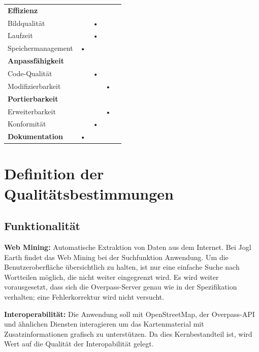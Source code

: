 \documentclass[10pt]{scrreprt}
\newenvironment{indents}{%
  \parskip6pt \parindent5mm \raggedright%
  \def\item{\hangindent=5mm \hangafter1}}{%
  \par\ignorespaces}
\begin{document}
\begin{center}
\begin{tabular}{lcccc}
\hline 
\rule[-1ex]{0pt}{4ex} \textbf{Effizienz} &  &  &  &  \\ 
\rule[-1ex]{0pt}{4ex} \hspace{10pt} Bildqualität & & • & & \\ 
\rule[-1ex]{0pt}{4ex} \hspace{10pt} Laufzeit & & • & & \\ 
\rule[-1ex]{0pt}{4ex} \hspace{10pt} Speichermanagement & • & & & \\ 

\hline 
\rule[-1ex]{0pt}{4ex} \textbf{Anpassfähigkeit} &  &  &  &  \\ 
\rule[-1ex]{0pt}{4ex} \hspace{10pt} Code-Qualität & & • & & \\ 
\rule[-1ex]{0pt}{4ex} \hspace{10pt} Modifizierbarkeit & & & • & \\ 

\hline 
\rule[-1ex]{0pt}{4ex} \textbf{Portierbarkeit} &  &  &  &  \\ 
\rule[-1ex]{0pt}{4ex} \hspace{10pt} Erweiterbarkeit & & & • & \\ 
\rule[-1ex]{0pt}{4ex} \hspace{10pt} Konformität & & • & & \\ 

\hline 
\rule[-1ex]{0pt}{4ex} \textbf{Dokumentation} & • & & & \\ 
\hline 
\end{tabular} 
\end{center}

\pagebreak



\section{Definition der Qualitätsbestimmungen}
\subsection*{Funktionalität}
\begin{indents}
\item \textbf{Web Mining:} Automatische Extraktion von Daten aus dem Internet. Bei Jogl Earth findet das Web Mining bei der Suchfunktion Anwendung. Um die Benutzeroberfläche übersichtlich zu halten, ist nur eine einfache Suche nach Wortteilen möglich, die nicht weiter eingegrenzt wird. Es wird weiter vorausgesetzt, dass sich die Overpass-Server genau wie in der Spezifikation verhalten; eine Fehlerkorrektur wird nicht versucht.

\item \textbf{Interoperabilität:} Die Anwendung soll mit OpenStreetMap, der Overpass-API und ähnlichen Diensten interagieren um das Kartenmaterial mit Zusatzinformationen grafisch zu unterstützen. Da dies Kernbestandteil ist, wird Wert auf die Qualität der Interopabilität gelegt.
\end{indents}
\end{document}
